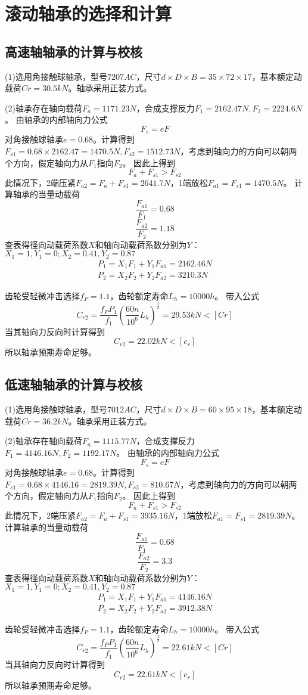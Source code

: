 \section{滚动轴承的选择和计算}
\subsection{高速轴轴承的计算与校核}
(1)选用角接触球轴承，型号$7207AC$，尺寸$d\times D\times B=35\times 72\times 17$，基本额定动载荷$Cr=30.5kN$。轴承采用正装方式。

(2)轴承存在轴向载荷$F_a=1171.23N$，合成支撑反力$F_1=2162.47N,F_2=2224.6N$。
由轴承的内部轴向力公式
\[
    F_s=eF
\]
对角接触球轴承$e=0.68$。计算得到$F_{s1}=0.68\times 2162.47=1470.5N,F_{s2}=1512.73N$，考虑到轴向力的方向可以朝两个方向，假定轴向力从$F_1$指向$F_2$。
因此上得到
\[
    F_a+F_{s1}>F_{s2}
\]
此情况下，2端压紧$F_{a2}=F_a+F_{s1}=2641.7N$，1端放松$F_{a1}=F_{s1}=1470.5N$。
计算轴承的当量动载荷
\[
    \frac{F_{a1}}{F_1}=0.68
\]
\[
    \frac{F_{a2}}{F_2}=1.18
\]
查表得径向动载荷系数$X$和轴向动载荷系数分别为$Y$：
$X_1=1,Y_1=0;X_2=0.41,Y_2=0.87$
\begin{align}
    P_1=X_1 F_1+Y_1 F_{a1}=2162.46N\\
    P_2=X_2 F_2+Y_2 F_{a2}=3210.3N
\end{align}

齿轮受轻微冲击选择$f_P=1.1$，齿轮额定寿命$L_h=10000h$。
带入公式
\begin{equation}
    C_{r2}=\frac{f_P P_1}{f_1}(\frac{60n}{10^6} L_h)^{\frac{1}{3}}=29.53kN<[Cr]
\end{equation}
当其轴向力反向时计算得到
\[
    C_{r2}=22.02kN<[c_r]
\]
所以轴承预期寿命足够。

\subsection{低速轴轴承的计算与校核}
(1)选用角接触球轴承，型号$7012AC$，尺寸$d\times D\times B=60\times 95\times 18$，基本额定动载荷$Cr=36.2kN$。轴承采用正装方式。

(2)轴承存在轴向载荷$F_a=1115.77N$，合成支撑反力$F_1=4146.16N,F_2=1192.17N$。
由轴承的内部轴向力公式
\[
    F_s=eF
\]
对角接触球轴承$e=0.68$。计算得到$F_{s1}=0.68\times 4146.16=2819.39N,F_{s2}=810.67N$，考虑到轴向力的方向可以朝两个方向，假定轴向力从$F_1$指向$F_2$。
因此上得到
\[
    F_a+F_{s1}>F_{s2}
\]
此情况下，2端压紧$F_{a2}=F_a+F_{s1}=3935.16N$，1端放松$F_{a1}=F_{s1}=2819.39N$。
计算轴承的当量动载荷
\[
    \frac{F_{a1}}{F_1}=0.68
\]
\[
    \frac{F_{a2}}{F_2}=3.3
\]
查表得径向动载荷系数$X$和轴向动载荷系数分别为$Y$：
$X_1=1,Y_1=0;X_2=0.41,Y_2=0.87$
\begin{align}
    P_1=X_1 F_1+Y_1 F_{a1}=4146.16N\\
    P_2=X_2 F_2+Y_2 F_{a2}=3912.38N
\end{align}

齿轮受轻微冲击选择$f_P=1.1$，齿轮额定寿命$L_h=10000h$。
带入公式
\begin{equation}
    C_{r2}=\frac{f_P P_1}{f_1}(\frac{60n}{10^6} L_h)^{\frac{1}{3}}=22.61kN<[Cr]
\end{equation}
当其轴向力反向时计算得到
\[
    C_{r2}=22.61kN<[c_r]
\]
所以轴承预期寿命足够。